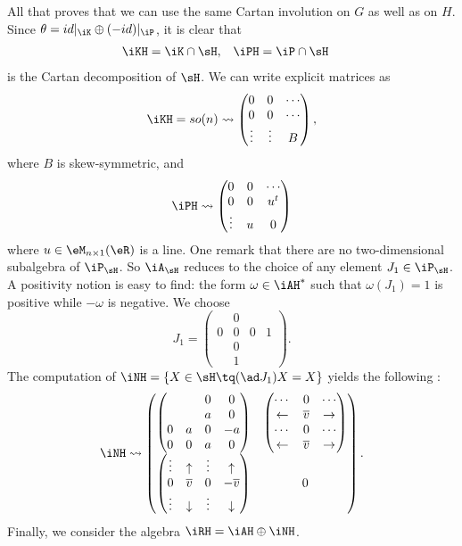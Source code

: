All that proves that we can use the same Cartan involution on $G$ as well as on $H$. Since $\theta=id|_{\iK}\oplus(-id)|_{\iP}$, it is clear that 
\begin{align}
   \iKH&=\iK\cap\sH,
   &\iPH&=\iP\cap\sH
\end{align}
is the Cartan decomposition of $\sH$. We can write explicit matrices as
\begin{equation}
\iKH=so(n)\leadsto
\begin{pmatrix}
  0&0&\cdots  \\
  0&0&\cdots  \\
  \vdots&\vdots& B
\end{pmatrix},
\end{equation}
where $B$ is skew-symmetric, and
\begin{equation}
\iPH\leadsto
\begin{pmatrix}
  0&0&\cdots  \\
  0&0& u^t  \\
  \vdots&u& 0
\end{pmatrix}
\end{equation}
where $u\in\eM_{n\times 1}(\eR)$ is a line. One remark that there are no two-dimensional subalgebra of $\iP_{\sH}$. So $\iA_{\sH}$ reduces to the choice of any element $J_1\in\iP_{\sH}$.  A positivity notion is easy to find: the form $\omega\in\iAH^*$ such that $\omega(J_1)=1$ is positive while $-\omega$ is negative. We choose
\[
  J_1=\begin{pmatrix}&0\\0&0&0&1\\&0\\&1\end{pmatrix}.
\]
The computation of $\iNH=\{X\in\sH\tq (\ad J_1)X=X\}$ yields the following :
\begin{equation}\label{eq:re_N_H}
\iNH\leadsto
\begin{pmatrix}
     \begin{pmatrix} &&0&0\\&&a&0\\0&a&0&-a\\0&0&a&0\end{pmatrix}
     & \begin{pmatrix}\cdots&0&\cdots\\\leftarrow&\overline{v}&\rightarrow\\
        \cdots&0&\cdots\\\leftarrow&\overline{v}&\rightarrow\end{pmatrix}\\
     \begin{pmatrix}\vdots&\uparrow&\vdots&\uparrow\\
                    0& \overline{v}&0&-\overline{v}\\
		    \vdots&\downarrow& \vdots&\downarrow \end{pmatrix}
     &0		    
\end{pmatrix}.
\end{equation}
Finally, we consider the algebra $\iRH=\iAH\oplus\iNH$.



